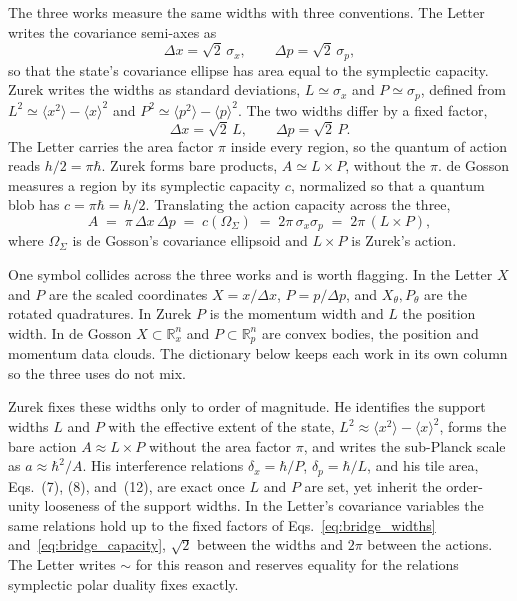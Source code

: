 \documentclass[%
  aps, amsmath, amssymb, onecolumn, 11pt
]{revtex4-2}
\begin{document}
The three works measure the same widths with three conventions. The
Letter writes the covariance semi-axes as
\begin{equation}
\Delta x = \sqrt{2}\,\sigma_x, \qquad \Delta p = \sqrt{2}\,\sigma_p,
\label{eq:capacity_semiaxes}
\end{equation}
so that the state's covariance ellipse has area equal to the symplectic capacity. Zurek writes the widths as standard
deviations, $L \simeq \sigma_x$ and $P \simeq \sigma_p$, defined from
$L^2 \simeq \langle x^2\rangle - \langle x\rangle^2$ and
$P^2 \simeq \langle p^2\rangle - \langle p\rangle^2$. The two widths
differ by a fixed factor,
\begin{equation}
\Delta x = \sqrt{2}\,L, \qquad \Delta p = \sqrt{2}\,P .
\label{eq:bridge_widths}
\end{equation}
The Letter carries the area factor $\pi$ inside every region, so the
quantum of action reads $h/2 = \pi\hbar$. Zurek forms bare products,
$A \simeq L \times P$, without the $\pi$. de Gosson measures a region by
its symplectic capacity $c$, normalized so that a quantum blob has
$c = \pi\hbar = h/2$. Translating the action capacity across the three,
\begin{equation}
A \;=\; \pi\,\Delta x\,\Delta p \;=\; c(\Omega_\Sigma) \;=\; 2\pi\,\sigma_x\sigma_p \;=\; 2\pi\,(L \times P),
\label{eq:bridge_capacity}
\end{equation}
where $\Omega_\Sigma$ is de Gosson's covariance ellipsoid and $L\times P$
is Zurek's action.

One symbol collides across the three works and is worth flagging. In the
Letter $X$ and $P$ are the scaled coordinates $X = x/\Delta x$,
$P = p/\Delta p$, and $X_\theta, P_\theta$ are the rotated quadratures.
In Zurek $P$ is the momentum width and $L$ the position width. In de
Gosson $X \subset \mathbb{R}^n_x$ and $P \subset \mathbb{R}^n_p$ are
convex bodies, the position and momentum data clouds. The dictionary
below keeps each work in its own column so the three uses do not mix.

Zurek fixes these widths only to order of magnitude. He identifies the
support widths $L$ and $P$ with the effective extent of the state,
$L^2 \approx \langle x^2\rangle - \langle x\rangle^2$, forms the bare
action $A \approx L\times P$ without the area factor $\pi$, and writes the
sub-Planck scale as $a \approx \hbar^2/A$. His interference relations
$\delta_x = \hbar/P$, $\delta_p = \hbar/L$, and his tile area, Eqs.~(7),
(8), and~(12), are exact once $L$ and $P$ are set, yet inherit the
order-unity looseness of the support widths. In the Letter's covariance
variables the same relations hold up to the fixed factors of
Eqs.~\eqref{eq:bridge_widths} and~\eqref{eq:bridge_capacity}, $\sqrt{2}$
between the widths and $2\pi$ between the actions. The Letter writes
$\sim$ for this reason and reserves equality for the relations symplectic
polar duality fixes exactly.
\end{document}
